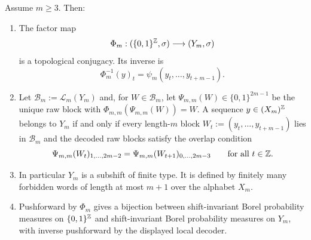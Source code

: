 \begin{theorem}\label{thm:two-sided-conjugacy}
Assume $m\ge3$.  Then:
\begin{enumerate}[label=(\roman*),leftmargin=*,itemsep=2pt]
  \item The factor map
  \[
  \Phi_m:(\{0,1\}^{\mathbb{Z}},\sigma)\longrightarrow(Y_m,\sigma)
  \]
  is a topological conjugacy.  Its inverse is
  \[
  \Phi_m^{-1}(y)_t=\psi_m(y_t,\ldots,y_{t+m-1}).
  \]
  \item Let $\mathcal B_m:=\mathcal L_m(Y_m)$ and, for
  $W\in\mathcal B_m$, let $\Psi_{m,m}(W)\in\{0,1\}^{2m-1}$ be the unique
  raw block with $\Phi_{m,m}(\Psi_{m,m}(W))=W$.  A sequence
  $y\in(X_m)^{\mathbb{Z}}$ belongs to $Y_m$ if and only if every length-$m$ block
  $W_t:=(y_t,\ldots,y_{t+m-1})$ lies in $\mathcal B_m$ and the decoded raw
  blocks satisfy the overlap condition
  \[
  \Psi_{m,m}(W_t)_{1,\ldots,2m-2}
  =
  \Psi_{m,m}(W_{t+1})_{0,\ldots,2m-3}
  \qquad\text{for all }t\in\mathbb{Z}.
  \]
  \item In particular $Y_m$ is a subshift of finite type.  It is defined by
  finitely many forbidden words of length at most $m+1$ over the alphabet
  $X_m$.
  \item Pushforward by $\Phi_m$ gives a bijection between shift-invariant
  Borel probability measures on $\{0,1\}^{\mathbb{Z}}$ and shift-invariant Borel
  probability measures on $Y_m$, with inverse pushforward by the displayed
  local decoder.
\end{enumerate}
\end{theorem}

